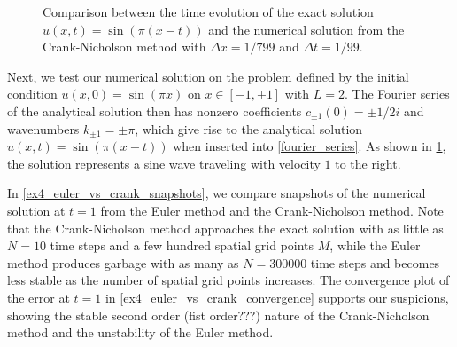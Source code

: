 \begin{figure}[b]
\centering
{}
\caption{\label{sine_evolution}Comparison between the time evolution of the exact solution $u(x,t)=\sin(\pi(x-t))$ and the numerical solution from the Crank-Nicholson method with $\Delta x=1/799$ and $\Delta t=1/99$.}
\end{figure}

Next, we test our numerical solution on the problem defined by the initial condition $u(x, 0) = \sin(\pi x)$ on $x \in [-1, +1]$ with $L = 2$.
The Fourier series of the analytical solution then has nonzero coefficients $c_{\pm1}(0) = \pm 1/2i$ and wavenumbers $k_{\pm 1} = \pm \pi$, which give rise to the analytical solution $u(x, t) = \sin(\pi(x-t))$ when inserted into \cref{fourier_series}.
As shown in \cref{sine_evolution}, the solution represents a sine wave traveling with velocity $1$ to the right.

In \cref{ex4_euler_vs_crank_snapshots}, we compare snapshots of the numerical solution at $t = 1$ from the Euler method and the Crank-Nicholson method.
Note that the Crank-Nicholson method approaches the exact solution with as little as $N=10$ time steps and a few hundred spatial grid points $M$, while the Euler method produces garbage with as many as $N=300000$ time steps and becomes less stable as the number of spatial grid points increases.
The convergence plot of the error at $t=1$ in \cref{ex4_euler_vs_crank_convergence} supports our suspicions, showing the stable second order (fist order???) nature of the Crank-Nicholson method and the unstability of the Euler method.

